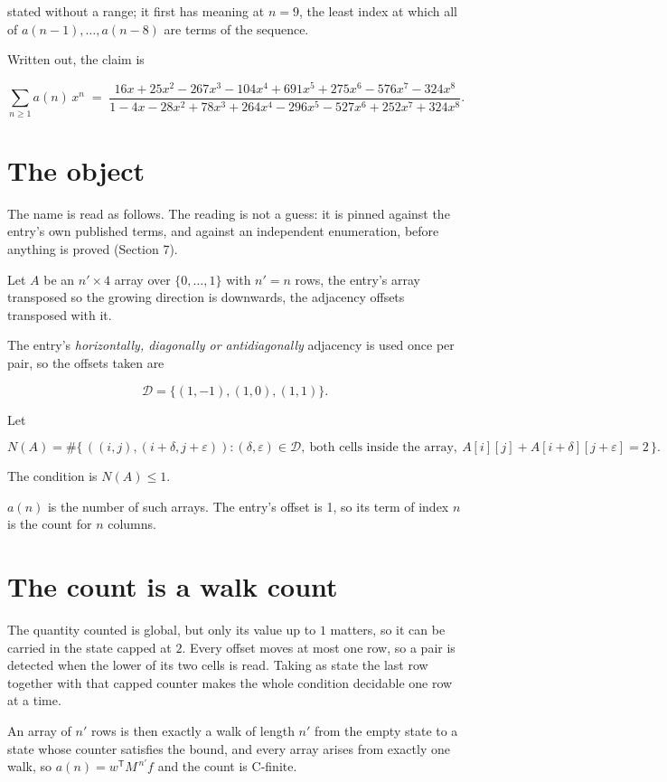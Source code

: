 \documentclass[11pt]{article}
\theoremstyle{definition}
\begin{document}
stated without a range; it first has meaning at $n = 9$, the least index at which all of $a(n-1),\dots,a(n-8)$ are terms of the sequence.

Written out, the claim is

\[\sum_{n \ge 1} a(n)\,x^n \;=\; \frac{16x + 25x^{2} - 267x^{3} - 104x^{4} + 691x^{5} + 275x^{6} - 576x^{7} - 324x^{8}}{1 - 4x - 28x^{2} + 78x^{3} + 264x^{4} - 296x^{5} - 527x^{6} + 252x^{7} + 324x^{8}}.\]

\section{The object}

The name is read as follows. The reading is not a guess: it is pinned against the entry's own published terms, and against an independent enumeration, before anything is proved (Section 7).

Let $A$ be an $n' \times 4$ array over $\{0,\dots,1\}$ with $n' = n$ rows, the entry's array transposed so the growing direction is downwards, the adjacency offsets transposed with it.

The entry's {\itshape horizontally, diagonally or antidiagonally} adjacency is used once per pair, so the offsets taken are

\[\mathcal{D} = \{(1,-1), (1,0), (1,1)\}.\]

Let

\[N(A) = \#\bigl\{\,((i,j),(i{+}\delta,j{+}\varepsilon)) : (\delta,\varepsilon) \in \mathcal{D},\ \text{both cells inside the array},\ A[i][j] + A[i{+}\delta][j{+}\varepsilon] = 2\,\bigr\}.\]

The condition is $N(A) \le 1$.

$a(n)$ is the number of such arrays. The entry's offset is 1, so its term of index $n$ is the count for $n$ columns.

\section{The count is a walk count}

The quantity counted is global, but only its value up to $1$ matters, so it can be carried in the state capped at $2$. Every offset moves at most one row, so a pair is detected when the lower of its two cells is read. Taking as state the last row together with that capped counter makes the whole condition decidable one row at a time.

An array of $n'$ rows is then exactly a walk of length $n'$ from the empty state to a state whose counter satisfies the bound, and every array arises from exactly one walk, so $a(n) = w^{\mathsf T}M^{\,n'}f$ and the count is C-finite.
\end{document}
